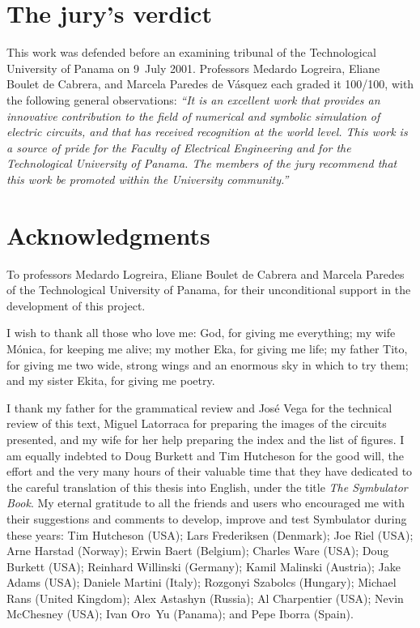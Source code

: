 \documentclass[11pt,oneside]{report}
\begin{document}
\section*{The jury's verdict}

This work was defended before an examining tribunal of the
Technological University of Panama on 9~July 2001. Professors
Medardo Logreira, Eliane Boulet de Cabrera, and Marcela Paredes de
V\'asquez each graded it 100/100, with the following general
observations: \emph{``It is an excellent work that provides an
innovative contribution to the field of numerical and symbolic
simulation of electric circuits, and that has received recognition
at the world level. This work is a source of pride for the Faculty
of Electrical Engineering and for the Technological University of
Panama. The members of the jury recommend that this work be promoted
within the University community.''}

\section*{Acknowledgments}

To professors Medardo Logreira, Eliane Boulet de Cabrera and Marcela
Paredes of the Technological University of Panama, for their
unconditional support in the development of this project.

I wish to thank all those who love me: God, for giving me
everything; my wife M\'onica, for keeping me alive; my mother Eka,
for giving me life; my father Tito, for giving me two wide, strong
wings and an enormous sky in which to try them; and my sister Ekita,
for giving me poetry.

I thank my father for the grammatical review and Jos\'e Vega for the
technical review of this text, Miguel Latorraca for preparing the
images of the circuits presented, and my wife for her help preparing
the index and the list of figures. I am equally indebted to Doug
Burkett and Tim Hutcheson for the good will, the effort and the very
many hours of their valuable time that they have dedicated to the
careful translation of this thesis into English, under the title
\emph{The Symbulator Book}. My eternal gratitude to all the friends
and users who encouraged me with their suggestions and comments to
develop, improve and test Symbulator during these years: Tim
Hutcheson (USA); Lars Frederiksen (Denmark); Joe Riel (USA); Arne
Harstad (Norway); Erwin Baert (Belgium); Charles Ware (USA); Doug
Burkett (USA); Reinhard Willinski (Germany); Kamil Malinski
(Austria); Jake Adams (USA); Daniele Martini (Italy); Rozgonyi
Szabolcs (Hungary); Michael Rans (United Kingdom); Alex Astashyn
(Russia); Al Charpentier (USA); Nevin McChesney (USA); Ivan Oro~Yu
(Panama); and Pepe Iborra (Spain).
\end{document}

